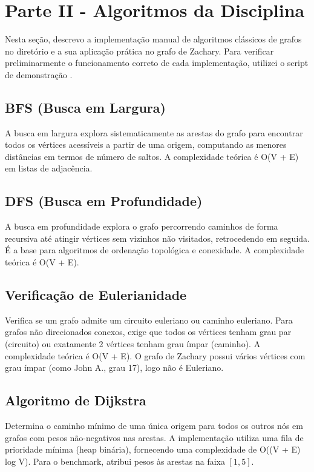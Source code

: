 \documentclass[sigconf]{webmedia}
\begin{document}
\section{Parte II - Algoritmos da Disciplina}
\label{sec:parte_ii}

Nesta seção, descrevo a implementação manual de algoritmos clássicos de grafos no diretório  e a sua aplicação prática no grafo de Zachary. Para verificar preliminarmente o funcionamento correto de cada implementação, utilizei o script de demonstração .

\subsection{BFS (Busca em Largura)}
A busca em largura explora sistematicamente as arestas do grafo para encontrar todos os vértices acessíveis a partir de uma origem, computando as menores distâncias em termos de número de saltos. A complexidade teórica é O(V + E) em listas de adjacência.

\subsection{DFS (Busca em Profundidade)}
A busca em profundidade explora o grafo percorrendo caminhos de forma recursiva até atingir vértices sem vizinhos não visitados, retrocedendo em seguida. É a base para algoritmos de ordenação topológica e conexidade. A complexidade teórica é O(V + E).

\subsection{Verificação de Eulerianidade}
Verifica se um grafo admite um circuito euleriano ou caminho euleriano. Para grafos não direcionados conexos, exige que todos os vértices tenham grau par (circuito) ou exatamente 2 vértices tenham grau ímpar (caminho). A complexidade teórica é O(V + E).
O grafo de Zachary possui vários vértices com grau ímpar (como John A., grau 17), logo não é Euleriano.

\subsection{Algoritmo de Dijkstra}
Determina o caminho mínimo de uma única origem para todos os outros nós em grafos com pesos não-negativos nas arestas. A implementação utiliza uma fila de prioridade mínima (heap binária), fornecendo uma complexidade de O((V + E) log V). Para o benchmark, atribui pesos às arestas na faixa $[1, 5]$.
\end{document}

